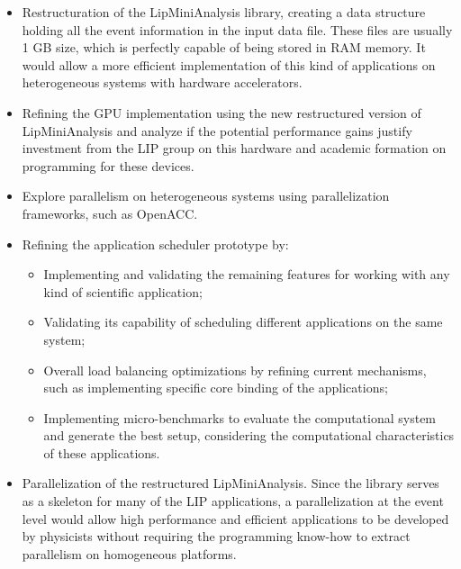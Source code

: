 \begin{itemize}
	\item Restructuration of the LipMiniAnalysis library, creating a data structure holding all the event information in the input data file. These files are usually 1 GB size, which is perfectly capable of being stored in RAM memory. It would allow a more efficient implementation of this kind of applications on heterogeneous systems with hardware accelerators.
	\item Refining the GPU implementation using the new restructured version of LipMiniAnalysis and analyze if the potential performance gains justify investment from the LIP group on this hardware and academic formation on programming for these devices.
	\item Explore parallelism on heterogeneous systems using parallelization frameworks, such as OpenACC.
	\item Refining the application scheduler prototype by:
	\begin{itemize}
		\item Implementing and validating the remaining features for working with any kind of scientific application;
		\item Validating its capability of scheduling different applications on the same system;
		\item Overall load balancing optimizations by refining current mechanisms, such as implementing specific core binding of the applications;
		\item Implementing micro-benchmarks to evaluate the computational system and generate the best setup, considering the computational characteristics of these applications.
	\end{itemize}
	\item Parallelization of the restructured LipMiniAnalysis. Since the library serves as a skeleton for many of the LIP applications, a parallelization at the event level would allow high performance and efficient applications to be developed by physicists without requiring the programming know-how to extract parallelism on homogeneous platforms.
\end{itemize}
